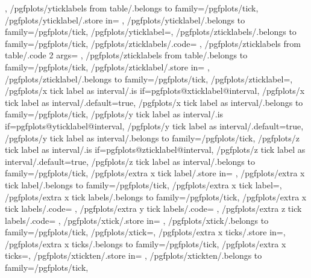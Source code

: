 {{		\let\pgfplots@yticklabel=\pgfplots@user@ticklabel@list@y
	},
	/pgfplots/yticklabels from table/.belongs to family=/pgfplots/tick,
	/pgfplots/yticklabel/.store in=	\pgfplots@yticklabel,
	/pgfplots/yticklabel/.belongs to family=/pgfplots/tick,
	/pgfplots/yticklabel=,
	/pgfplots/zticklabels/.belongs to family=/pgfplots/tick,
	/pgfplots/zticklabels/.code={%
		\pgfplotslistnew{}%
		\let\pgfplots@zticklabel=\pgfplots@user@ticklabel@list@z
	},
	/pgfplots/zticklabels from table/.code 2 args={%
		\to\pgfplots@zticklabels
		\let\pgfplots@zticklabel=\pgfplots@user@ticklabel@list@z
	},
	/pgfplots/zticklabels from table/.belongs to family=/pgfplots/tick,
	/pgfplots/zticklabel/.store in=	\pgfplots@zticklabel,
	/pgfplots/zticklabel/.belongs to family=/pgfplots/tick,
	/pgfplots/zticklabel=,
	/pgfplots/x tick label as interval/.is if=pgfplots@xticklabel@interval,
	/pgfplots/x tick label as interval/.default=true,
	/pgfplots/x tick label as interval/.belongs to family=/pgfplots/tick,
	/pgfplots/y tick label as interval/.is if=pgfplots@yticklabel@interval,
	/pgfplots/y tick label as interval/.default=true,
	/pgfplots/y tick label as interval/.belongs to family=/pgfplots/tick,
	/pgfplots/z tick label as interval/.is if=pgfplots@zticklabel@interval,
	/pgfplots/z tick label as interval/.default=true,
	/pgfplots/z tick label as interval/.belongs to family=/pgfplots/tick,
	/pgfplots/extra x tick label/.store in=	\pgfplots@extra@xticklabel,
	/pgfplots/extra x tick label/.belongs to family=/pgfplots/tick,
	/pgfplots/extra x tick label=,
	/pgfplots/extra x tick labels/.belongs to family=/pgfplots/tick,
	/pgfplots/extra x tick labels/.code={%
		\pgfplotslistnew{}%
		\let\pgfplots@extra@xticklabel=\pgfplots@user@extra@ticklabel@list@x
	},
	/pgfplots/extra y tick labels/.code={%
		\pgfplotslistnew{}%
		\let\pgfplots@extra@yticklabel=\pgfplots@user@extra@ticklabel@list@y
	},
	/pgfplots/extra z tick labels/.code={%
		\pgfplotslistnew{}%
		\let\pgfplots@extra@zticklabel=\pgfplots@user@extra@ticklabel@list@z
	},
	/pgfplots/xtick/.store in=			\pgfplots@xtick,
	/pgfplots/xtick/.belongs to family=/pgfplots/tick,
	/pgfplots/xtick=,
	/pgfplots/extra x ticks/.store in=\pgfplots@extra@xtick,
	/pgfplots/extra x ticks/.belongs to family=/pgfplots/tick,
	/pgfplots/extra x ticks=,
	/pgfplots/xtickten/.store in=		\pgfplots@xtickten,
	/pgfplots/xtickten/.belongs to family=/pgfplots/tick,
}
